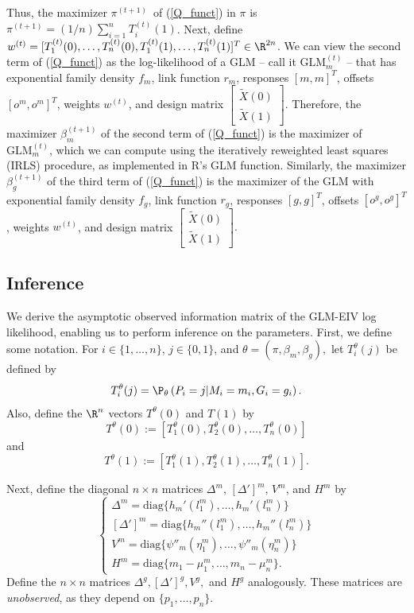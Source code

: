 \documentclass[12pt]{article}
\begin{document}
\begin{appendices}
Thus, the maximizer $\pi^{(t+1)}$ of (\ref{Q_funct}) in $\pi$ is $\pi^{(t+1)} = (1/n)\sum_{i=1}^n T^{(t)}_i(1)$. Next, define $w^{(t)} = [T^{(t)}_1(0), \dots, T^{(t)}_n(0), T^{(t)}_1(1), \dots, T^{(t)}_n(1)]^T \in \R^{2n}$. We can view the second term of (\ref{Q_funct}) as the log-likelihood of a GLM -- call it $\textrm{GLM}^{(t)}_m$ -- that has exponential family density $f_m$, link function $r_m$, responses $[m,m]^T$, offsets $[o^m, o^m]^T$, weights $w^{(t)}$, and design matrix $\begin{bmatrix} \tilde{X}(0) \\ \tilde{X}(1) \end{bmatrix}.$ Therefore, the maximizer $\beta^{(t+1)}_m$ of the second term of (\ref{Q_funct}) is the maximizer of $\textrm{GLM}^{(t)}_m$, which we can compute using the iteratively reweighted least squares (IRLS) procedure, as implemented in R's GLM function. Similarly, the maximizer $\beta^{(t+1)}_g$ of the third term of (\ref{Q_funct}) is the maximizer of the GLM with exponential family density $f_g$, link function $r_g$, responses $[g,g]^T$, offsets $[o^g, o^g]^T$, weights $w^{(t)}$, and design matrix $\begin{bmatrix} \tilde{X}(0) \\ \tilde{X}(1) \end{bmatrix}.$

\subsection{Inference}
We derive the asymptotic observed information matrix of the GLM-EIV log likelihood, enabling us to perform inference on the parameters. First, we define some notation. For $i \in \{1, \dots, n\}$, $j \in \{0, 1\}$, and $\theta = (\pi, \beta_m, \beta_g),$ let $T^\theta_i(j)$ be defined by
$$T^\theta_i(j) = \P_\theta\left(P_i = j | M_i = m_i, G_i = g_i\right).$$ Also, define the $\R^n$ vectors $T^\theta(0)$ and $T(1)$ by
$$T^\theta(0) := [T^\theta_1(0), T^\theta_2(0), \dots, T^\theta_n(0)]$$ and 
$$T^\theta(1) := [T^\theta_1(1), T^\theta_2(1), \dots, T^\theta_n(1)].$$

Next, define the diagonal $n \times n$ matrices $\Delta^m$, $[\Delta']^m$, $V^m$, and $H^m$ by
$$
\begin{cases}
	\Delta^m = \textrm{diag} \{ h_m'(l_1^m), \dots, h_m'( l_n^m ) \} \\
	[\Delta']^m = \textrm{diag} \{ h_m''(l_1^m), \dots, h_m''( l_n^m) \} \\
	V^m = \textrm{diag} \{ \psi''_m( \eta^m_1), \dots, \psi''_m( \eta^m_n) \} \\
	H^m = \textrm{diag} \{ m_1 - \mu_1^m, \dots, m_n - \mu_n^m\}.
\end{cases} 
$$ Define the $n \times n$ matrices $\Delta^g, [\Delta']^g, V^g,$ and $H^g$ analogously. These matrices are \textit{unobserved}, as they depend on $\{p_1, \dots, p_n\}$.


\end{appendices}
\end{document}
